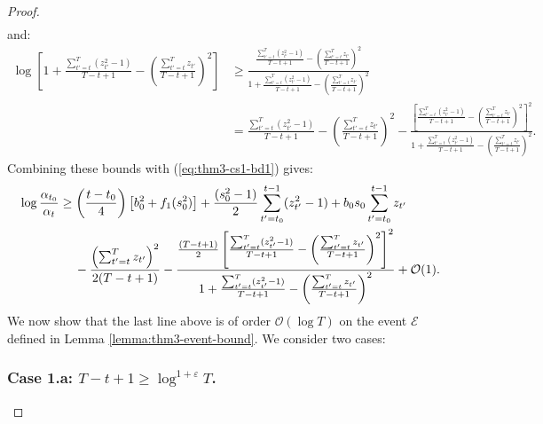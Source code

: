 \begin{proof}
\begin{align*}
\end{align*}
\normalsize
and: 
\small
\begin{align*}
    \log\left[1 + \frac{\sum_{t'=t}^T (z_{t'}^2-1)}{T-t+1} - \left(\frac{\sum_{t'=t}^T z_{t'}}{T-t+1}\right)^2\right] &\geq \frac{\frac{\sum_{t'=t}^T (z_{t'}^2-1)}{T-t+1} - \left(\frac{\sum_{t'=t}^T z_{t'}}{T-t+1}\right)^2}{1 + \frac{\sum_{t'=t}^T (z_{t'}^2-1)}{T-t+1} - \left(\frac{\sum_{t'=t}^T z_{t'}}{T-t+1}\right)^2 } \\
    &= \frac{\sum_{t'=t}^T (z_{t'}^2-1)}{T-t+1} - \left(\frac{\sum_{t'=t}^T z_{t'}}{T-t+1}\right)^2 - \frac{\left[\frac{\sum_{t'=t}^T (z_{t'}^2-1)}{T-t+1} - \left(\frac{\sum_{t'=t}^T z_{t'}}{T-t+1}\right)^2 \right]^2}{1 + \frac{\sum_{t'=t}^T (z_{t'}^2-1)}{T-t+1} - \left(\frac{\sum_{t'=t}^T z_{t'}}{T-t+1}\right)^2 }.
\end{align*}
\normalsize
Combining these bounds with (\ref{eq:thm3-cs1-bd1}) gives: 
\begin{align}
    \log \frac{\alpha_{t_0}}{\alpha_t} &\geq \left(\frac{t-t_0}{4}\right)\left[b_0^2 + f_1(s_0^2)\right]  + \frac{(s_0^2-1)}{2} \sum_{t' = t_0}^{t - 1} (z_{t'}^2-1) + b_0 s_0 \sum_{t' = t_0}^{t - 1} z_{t'} \notag \\
    &\quad\:  - \frac{\left(\sum_{t'=t}^T z_{t'}\right)^2}{2(T-t+1)} - \frac{\frac{(T-t+1)}{2}\left[\frac{\sum_{t'=t}^T (z_{t'}^2-1)}{T-t+1} - \left(\frac{\sum_{t'=t}^T z_{t'}}{T-t+1}\right)^2 \right]^2}{1 + \frac{\sum_{t'=t}^T (z_{t'}^2-1)}{T-t+1} - \left(\frac{\sum_{t'=t}^T z_{t'}}{T-t+1}\right)^2 } + \mathcal{O}(1). \label{eq:thm3-cs1-bd2}
\end{align}
We now show that the last line above is of order $\mathcal{O}(\log T)$ on the event $\mathcal{E}$ defined in Lemma \ref{lemma:thm3-event-bound}. We consider two cases: 

\subsubsection*{Case 1.a: $T -t+1 \geq \log^{1+\varepsilon} T$.}


\end{proof}
